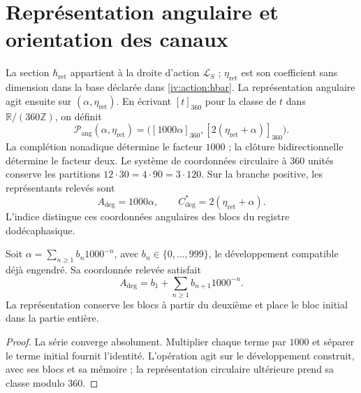 \section{Représentation angulaire et orientation des canaux}
\label{iv:angular:section}

La section \(\hbar_{\mathrm{ret}}\) appartient à la droite
d’action \(\mathcal L_S\) ; \(\eta_{\mathrm{ret}}\) est son
coefficient sans dimension dans la base déclarée dans
\eqref{iv:action:hbar}. La représentation angulaire agit ensuite
sur \((\alpha,\eta_{\mathrm{ret}})\). En écrivant
\([t]_{360}\) pour la classe de \(t\) dans
\(\mathbb R/(360\mathbb Z)\), on définit
\begin{equation}
 \mathcal P_{\mathrm{ang}}(\alpha,\eta_{\mathrm{ret}})
 =\bigl([1000\alpha]_{360},
        [2(\eta_{\mathrm{ret}}+\alpha)]_{360}\bigr).
 \label{iv:angular:publicacion}
\end{equation}
La complétion nonadique détermine le facteur \(1000\) ; la
clôture bidirectionnelle détermine le facteur deux. Le système de coordonnées circulaire
à \(360\) unités conserve les partitions
\(12\cdot30=4\cdot90=3\cdot120\). Sur la branche positive, les
représentants relevés sont
\begin{equation}
 A_{\deg}=1000\alpha,\qquad
 C^*_{\deg}=2(\eta_{\mathrm{ret}}+\alpha).
 \label{iv:angular:representantes}
\end{equation}
L’indice distingue ces coordonnées angulaires des blocs
du registre dodécaphasique.

\begin{proposition}
\label{iv:angular:desplazamiento}
Soit \(\alpha=\sum_{n\geq1}b_n1000^{-n}\), avec
\(b_n\in\{0,\ldots,999\}\), le développement compatible déjà
engendré. Sa coordonnée relevée satisfait
\[
 A_{\deg}=b_1+\sum_{n\geq1}b_{n+1}1000^{-n}.
\]
La représentation conserve les blocs à partir du deuxième et
place le bloc initial dans la partie entière.
\end{proposition}
\begin{proof}
La série converge absolument. Multiplier chaque terme par
\(1000\) et séparer le terme initial fournit l’identité.
L’opération agit sur le développement construit, avec ses
blocs et sa mémoire ; la représentation circulaire ultérieure prend
sa classe modulo \(360\).
\end{proof}

